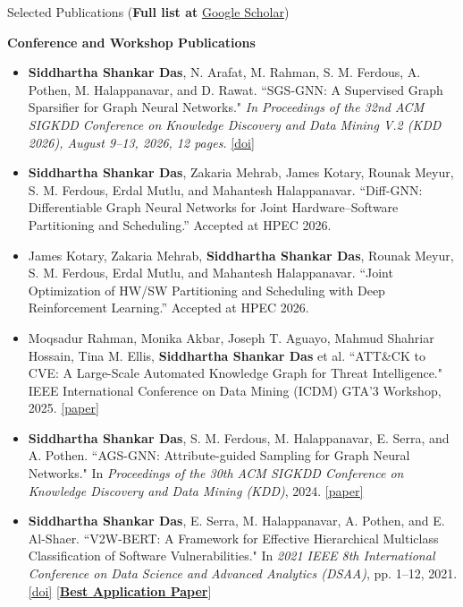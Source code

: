 \documentclass{resume} %
\begin{document}
\begin{rSection}{Selected Publications (\textbf{Full list at } \href{https://scholar.google.com/citations?user=kTAFl2yYe6QC&hl=en}{Google Scholar})}

\textbf{Conference and Workshop Publications}
\begin{itemize}
    \item \textbf{Siddhartha Shankar Das}, N. Arafat, M. Rahman, S. M. Ferdous, A. Pothen, M. Halappanavar, and D. Rawat. ``SGS-GNN: A Supervised Graph Sparsifier for Graph Neural Networks." \textit{In Proceedings of the 32nd ACM SIGKDD Conference on Knowledge Discovery and Data Mining V.2 (KDD 2026), August 9–13, 2026, 12 pages.} \href{https://doi.org/10.1145/3770855.3818110}{[doi]}

    \item \textbf{Siddhartha Shankar Das}, Zakaria Mehrab, James Kotary, Rounak Meyur, S. M. Ferdous, Erdal Mutlu, and Mahantesh Halappanavar. “Diff-GNN: Differentiable Graph Neural Networks for Joint Hardware–Software Partitioning and Scheduling.” Accepted at HPEC 2026.
    
    \item James Kotary, Zakaria Mehrab, \textbf{Siddhartha Shankar Das}, Rounak Meyur, S. M. Ferdous, Erdal Mutlu, and Mahantesh Halappanavar. “Joint Optimization of HW/SW Partitioning and Scheduling with Deep Reinforcement Learning.” Accepted at HPEC 2026.
    
    \item Moqsadur Rahman, Monika Akbar, Joseph T. Aguayo, Mahmud Shahriar Hossain, Tina M. Ellis, \textbf{Siddhartha Shankar Das} et al. ``ATT\&CK to CVE: A Large-Scale Automated Knowledge Graph for Threat Intelligence." IEEE International Conference on Data Mining (ICDM) GTA'3 Workshop, 2025. \href{https://monowarhasan.info/papers/attack2cve_GTA3_25.pdf}{[paper]}
    
    \item \textbf{Siddhartha Shankar Das}, S. M. Ferdous, M. Halappanavar, E. Serra, and A. Pothen. ``AGS-GNN: Attribute-guided Sampling for Graph Neural Networks." In \textit{Proceedings of the 30th ACM SIGKDD Conference on Knowledge Discovery and Data Mining (KDD)}, 2024. \href{https://arxiv.org/abs/2405.15218}{[paper]}
    
    \item \textbf{Siddhartha Shankar Das}, E. Serra, M. Halappanavar, A. Pothen, and E. Al-Shaer. ``V2W-BERT: A Framework for Effective Hierarchical Multiclass Classification of Software Vulnerabilities." In \textit{2021 IEEE 8th International Conference on Data Science and Advanced Analytics (DSAA)}, pp. 1--12, 2021. \href{https://doi.org/10.1109/DSAA53316.2021.9564227}{[doi]} [\href{https://www.cs.purdue.edu/news/articles/2021/pothen_v2w-bert.html}{\textbf{Best Application Paper}}]


\end{itemize}
\end{rSection}
\end{document}

